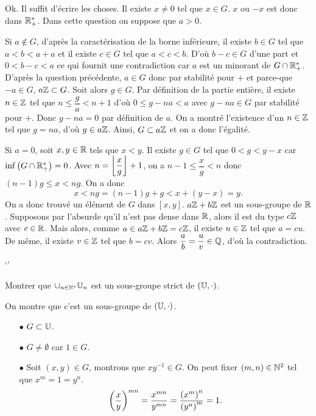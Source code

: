\documentclass{magnolia}
\begin{document}
\begin{sol}
\begin{questions}
\question Ok. Il suffit d'écrire les choses.
\question Il existe $x\neq 0$ tel que $x\in G$. $x$ ou $-x$ est donc dans $\mathbb{R}_+^*$.
\question Dans cette question on suppose que $a>0$.
  \begin{questions}
  \question Si $a\notin G$, d'après la caractérisation de la borne inférieure, il existe $b\in G$ tel que $a<b< a+a$ et il existe $c \in G$ tel que $a<c<b$. D'où $b-c \in G$ d'une part et $0<b-c<a$ ce qui fournit une contradiction car $a$ est un minorant de $G\cap\mathbb{R}_+^*$.
  \question D'après la question précédente, $a\in G$ donc par stabilité pour $+$ et parce-que $-a\in G$, $a\mathbb{Z} \subset G$. Soit alors $g\in G$. Par définition de la partie entière, il existe $n\in \mathbb{Z}$ tel que $n\leq \dfrac{g}{a}<n+1$ d'où $0\leq g-na <a$ avec $g-na \in G$ par stabilité pour $+$. Donc $g-na=0$ par définition de $a$. On a montré l'existence d'un $n\in \mathbb{Z}$ tel que $g=na$, d'où $g \in a\mathbb{Z}$. Ainsi, $G\subset a\mathbb{Z}$ et on a donc l'égalité.
  \end{questions}
\question Si $a=0$, soit $x,y \in \mathbb{R}$ tels que $x<y$. Il existe $g\in G$ tel que $0<g<y-x$ car $\inf\left(G\cap\mathbb{R}_+^*\right)=0$. Avec $n=\left\lfloor\dfrac{x}{g}\right\rfloor+1$, on a $n-1\leq \dfrac{x}{g} <n$ donc $(n-1)g\leq x < ng$. On a donc $$x<ng=(n-1)g+g <x+(y-x)=y.$$ On a donc trouvé un élément de $G$ dans $[x,y]$.
\question 
  $a\mathbb{Z}+b\mathbb{Z}$ est un sous-groupe de $\mathbb{R}$. Supposons par l'absurde qu'il n'est pas dense dans $\mathbb{R}$, alors il est du type $c\mathbb{Z}$ avec $c\in \mathbb{R}$. Mais alors, comme $a \in a\mathbb{Z}+b\mathbb{Z}=c\mathbb{Z}$, il existe $u\in \mathbb{Z}$ tel que $a=cu$. De même, il existe $v\in \mathbb{Z}$ tel que $b=cv$. Alors $\dfrac{a}{b}=\dfrac{u}{v} \in \mathbb{Q}$, d'où la contradiction.
\question 
  
  \begin{questions}
  \question 
  \question 
  \end{questions}
\end{questions}

\end{sol}`'

Montrer que $\cup_{n\in\Ns} \U[n]$ est un sous-groupe strict de
$(\U,\cdot)$.

\begin{sol}
On montre que c'est un sous-groupe de $(\U,\cdot)$.
\begin{itemize}
\item[$\bullet$] $G\subset \U$.
\item[$\bullet$] $G\neq \emptyset$ car $1\in G$.
\item[$\bullet$] Soit $(x,y)\in G$, montrons que $xy^{-1} \in G$. On peut fixer $(m,n)\in \mathbb{N}^2$ tel que $x^m=1=y^n$.
$$\left(\frac{x}{y}\right)^{mn}=\frac{x^{mn}}{y^{mn}}=\frac{\left(x^m\right)^n}{\left(y^n\right)^m}=1.$$
\end{itemize}
\end{sol}
\end{document}
